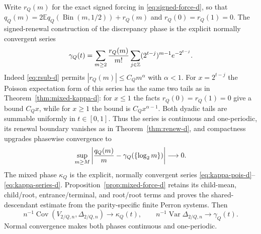 \documentclass[11pt]{article}
\numberwithin{equation}{section}
\newcommand{\1}{\mathbf 1}\newcommand{\F}{\mathcal F}\newcommand{\D}{\mathcal D}
\begin{document}
Write $r_Q(m)$ for the exact signed forcing in
\eqref{eq:signed-force-d}, so that
$q_Q(m)=2\mathbb E q_Q(\operatorname {Bin}(m,1/2))+r_Q(m)$ and
$r_Q(0)=r_Q(1)=0$.  The signed-renewal construction of the discrepancy
phase is the explicit normally convergent series
\begin{equation}
 \gamma_Q(t)=\sum_{m\ge2}{r_Q(m)\over m!}
 \sum_{j\in\mathbb Z}(2^{t-j})^{m-1}e^{-2^{t-j}}.       \label{eq:gamma-series-d}
\end{equation}
Indeed \eqref{eq:rsub-d} permits $|r_Q(m)|\le C_Qm^\alpha$ with
$\alpha<1$.  For $x=2^{t-j}$ the Poisson expectation form of this series
has the same two tails as in Theorem~\ref{thm:mixed-kappa-d}: for $x\le1$
the facts $r_Q(0)=r_Q(1)=0$ give a bound $C_Qx$, while for $x\ge1$ the
bound is $C_Qx^{\alpha-1}$.  Both dyadic tails are summable uniformly in
$t\in[0,1]$.  Thus the series is continuous and one-periodic, its renewal
boundary vanishes as in Theorem~\ref{thm:renew-d}, and compactness upgrades
phasewise convergence to
\begin{equation}
 \sup_{m\ge M}
 \left|{q_Q(m)\over m}-\gamma_Q(\{\log_2m\})\right|\longrightarrow0.
                                                               \label{eq:gamma-uniform-d}
\end{equation}
The mixed phase $\kappa_Q$ is the explicit, normally convergent series
\eqref{eq:kappa-pois-d}--\eqref{eq:kappa-series-d}.
Proposition~\ref{prop:mixed-force-d} retains its
child-mean, child/root, entrance/terminal, and root/root terms and proves the
shared-descendant estimate from the parity-specific finite Perron systems.
Then
\begin{equation}
 n^{-1}\operatorname{Cov}(V_{2/Q,n},\Delta_{2/Q,n})\to\kappa_Q(t),\qquad
 n^{-1}\operatorname{Var}\Delta_{2/Q,n}\to\gamma_Q(t).       \label{eq:res-phases-d}
\end{equation}
Normal convergence makes both phases continuous and one-periodic.
\end{document}
